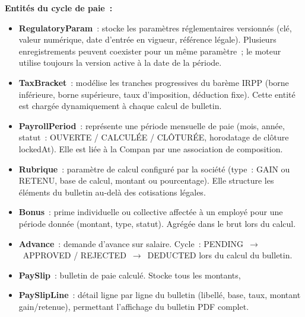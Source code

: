 \textbf{Entités du cycle de paie~:}
\begin{itemize}[label=\textbullet, leftmargin=0.6cm]
    \item \textbf{RegulatoryParam}~: stocke les paramètres
          réglementaires versionnés (clé, valeur numérique, date d'entrée
          en vigueur, référence légale). Plusieurs enregistrements peuvent
          coexister pour un même paramètre~; le moteur utilise toujours
          la version active à la date de la période.

    \item \textbf{TaxBracket}~: modélise les tranches progressives
          du barème IRPP (borne inférieure, borne supérieure, taux
          d'imposition, déduction fixe). Cette entité est chargée
          dynamiquement à chaque calcul de bulletin.

    \item \textbf{PayrollPeriod}~: représente une période mensuelle
          de paie (mois, année, statut~: OUVERTE /
          CALCULÉE / CLÔTURÉE, horodatage de clôture
          lockedAt). Elle est liée à la Compan
          par une association de composition.

    \item \textbf{Rubrique}~: paramètre de calcul configuré par
          la société (type~: GAIN ou RETENU, base
          de calcul, montant ou pourcentage). Elle structure les éléments
          du bulletin au-delà des cotisations légales.

    \item \textbf{Bonus}~: prime individuelle ou collective
          affectée à un employé pour une période donnée (montant, type,
          statut). Agrégée dans le brut lors du calcul.

    \item \textbf{Advance}~: demande d'avance sur salaire.
          Cycle~: PENDING~$\rightarrow$~APPROVED
          / REJECTED~$\rightarrow$~DEDUCTED lors
          du calcul du bulletin.

    \item \textbf{PaySlip}~: bulletin de paie calculé. Stocke
          tous les montants,

    \item \textbf{PaySlipLine}~: détail ligne par ligne du
          bulletin (libellé, base, taux, montant gain/retenue), permettant
          l'affichage du bulletin PDF complet.
\end{itemize}

